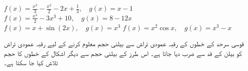 $f(x)=\tfrac{x^3}{3}-\tfrac{x^2}{2}-2x+\tfrac{1}{3},\quad g(x)=x-1$
$f(x)=\tfrac{x^4}{2}-3x^3+10,\quad g(x)=8-12x$
$f(x)=x+\sin(2x),\quad g(x)=x^3$
$f(x)=x^2\cos x,\quad g(x)=x^3-x$


قوسی سرحد کے خطوں کے رقبہ عمودی تراش سے بیلنی حجم معلوم کرنے کے لیے رقبہ عمودی تراش کو بیلن کے قد سے ضرب دیا جاتا ہے۔ اس طرز کے بیلنی حجم سے دیگر اشکال کے خطوں کا حجم تلاش کیا جا سکتا ہے۔

